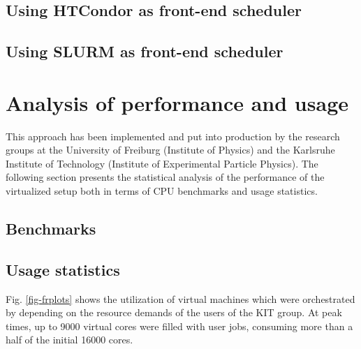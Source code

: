 \subsection{Using HTCondor as front-end scheduler}\label{sec:ROCED:HTCondor}


\subsection{Using SLURM as front-end scheduler}



\section{Analysis of performance and usage}

This approach has been implemented and put into production by the research groups at the University of Freiburg (Institute of Physics) and the Karlsruhe Institute of Technology (Institute of Experimental
Particle Physics). The following section presents the statistical analysis of the performance of the virtualized setup both in terms of CPU benchmarks and usage statistics.

\subsection{Benchmarks}




%
%
%
\subsection{Usage statistics}
Fig. \ref{fig-frplots} shows the utilization of virtual machines which were orchestrated by \Roced depending on the resource demands of the users of the KIT group.
At peak times, up to 9000 virtual cores were filled with user jobs, consuming more than a half of the initial 16000 \NEMO cores.

